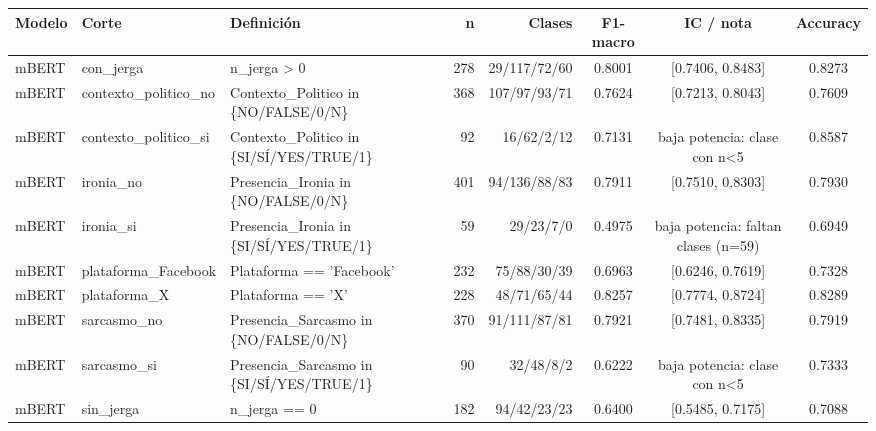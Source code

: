 \begin{tabular}{lllrrccc}
\toprule
Modelo & Corte & Definición & n & Clases & F1-macro & IC / nota & Accuracy \\
\midrule
mBERT & con\_jerga & n\_jerga > 0 & 278 & 29/117/72/60 & 0.8001 & [0.7406, 0.8483] & 0.8273 \\
mBERT & contexto\_politico\_no & Contexto\_Politico in \{NO/FALSE/0/N\} & 368 & 107/97/93/71 & 0.7624 & [0.7213, 0.8043] & 0.7609 \\
mBERT & contexto\_politico\_si & Contexto\_Politico in \{SI/SÍ/YES/TRUE/1\} & 92 & 16/62/2/12 & 0.7131 & baja potencia: clase con n<5 & 0.8587 \\
mBERT & ironia\_no & Presencia\_Ironia in \{NO/FALSE/0/N\} & 401 & 94/136/88/83 & 0.7911 & [0.7510, 0.8303] & 0.7930 \\
mBERT & ironia\_si & Presencia\_Ironia in \{SI/SÍ/YES/TRUE/1\} & 59 & 29/23/7/0 & 0.4975 & baja potencia: faltan clases (n=59) & 0.6949 \\
mBERT & plataforma\_Facebook & Plataforma == 'Facebook' & 232 & 75/88/30/39 & 0.6963 & [0.6246, 0.7619] & 0.7328 \\
mBERT & plataforma\_X & Plataforma == 'X' & 228 & 48/71/65/44 & 0.8257 & [0.7774, 0.8724] & 0.8289 \\
mBERT & sarcasmo\_no & Presencia\_Sarcasmo in \{NO/FALSE/0/N\} & 370 & 91/111/87/81 & 0.7921 & [0.7481, 0.8335] & 0.7919 \\
mBERT & sarcasmo\_si & Presencia\_Sarcasmo in \{SI/SÍ/YES/TRUE/1\} & 90 & 32/48/8/2 & 0.6222 & baja potencia: clase con n<5 & 0.7333 \\
mBERT & sin\_jerga & n\_jerga == 0 & 182 & 94/42/23/23 & 0.6400 & [0.5485, 0.7175] & 0.7088 \\
\bottomrule
\end{tabular}
